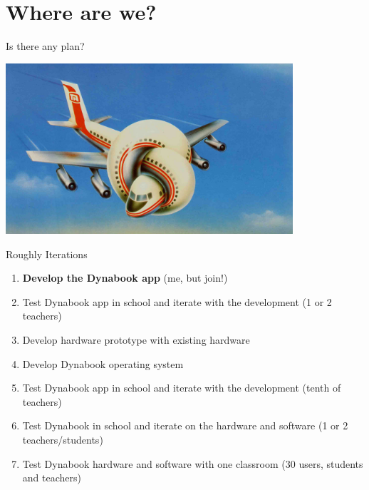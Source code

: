 \documentclass{beamer}
\begin{document}
\section{Where are we?}
\begin{frame}{Is there any plan?}
\begin{center}
  \includegraphics[width=0.8\textwidth]{anyPilot.jpeg}
\end{center}
\end{frame}
\begin{frame}{Roughly}
  Iterations
  \begin{enumerate}
  \item \textbf{Develop the Dynabook app} (me, but join!)
  \item Test Dynabook app in school and iterate with the development (1 or 2 teachers)
  \item Develop hardware prototype with existing hardware
  \item Develop Dynabook operating system
  \item Test Dynabook app in school and iterate with the development
    (tenth of teachers)
  \item Test Dynabook in school and iterate on the hardware and
    software (1 or 2 teachers/students)
  \item Test Dynabook hardware and software with one classroom (30 users, students and teachers)
  \end{enumerate}
\end{frame}
\end{document}
